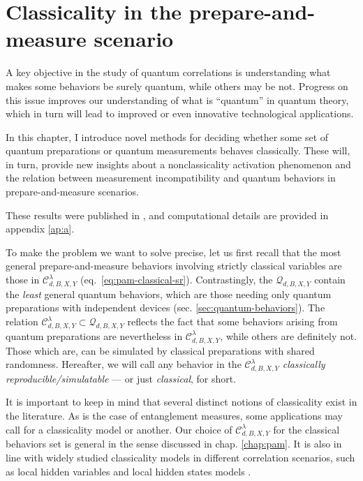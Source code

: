 \chapter{Classicality in the prepare-and-measure scenario}
\label{chap:pam-classical}

    A key objective in the study of quantum correlations is understanding what makes some behaviors be surely quantum, while others may be not. Progress on this issue improves our understanding of what is ``quantum'' in quantum theory, which in turn will lead to improved or even innovative technological applications.

    In this chapter, I introduce novel methods for deciding whether some set of quantum preparations or quantum measurements behaves classically. These will, in turn, provide new insights about a nonclassicality activation phenomenon and the relation between measurement incompatibility and quantum behaviors in prepare-and-measure scenarios.

    These results were published in \cite{degois_2021_general}, and computational details are provided in appendix \ref{ap:a}.

    \ornamentbreak

    To make the problem we want to solve precise, let us first recall that  the most general prepare-and-measure behaviors involving strictly classical variables are those in $\mathcal{C}^\lambda_{d,B,X,Y}$ (eq.~\eqref{eq:pam-classical-sr}).  Contrastingly, the $\mathcal{Q}_{d,B,X,Y}$ contain the \emph{least} general quantum behaviors, which are those needing only quantum preparations with independent devices (sec. \ref{sec:quantum-behaviors}). The relation $\mathcal{C}_{d,B,X,Y}^\lambda \subset \mathcal{Q}_{d,B,X,Y}$  reflects the fact that some behaviors arising from quantum preparations are nevertheless in $\mathcal{C}_{d,B,X,Y}^\lambda$, while others are definitely not. Those which are, can be simulated by classical preparations with shared randomness. Hereafter, we will call any behavior in the $\mathcal{C}^\lambda_{d,B,X,Y}$ \emph{classically reproducible/simulatable} --- or just \emph{classical}, for short.

    It is important to keep in mind that several distinct notions of classicality exist in the literature. As is the case of entanglement measures, some applications may call for a classicality model or another. Our choice of $\mathcal{C}_{d,B,X,Y}^\lambda$ for the classical behaviors set is general in the sense discussed in chap. \ref{chap:pam}. It is also in line with widely studied classicality models in different correlation scenarios, such as local hidden variables and local hidden states models \cite{brunner_2014_nonlocality,uola_2020_steering,cavalcanti_2016_steering}.

